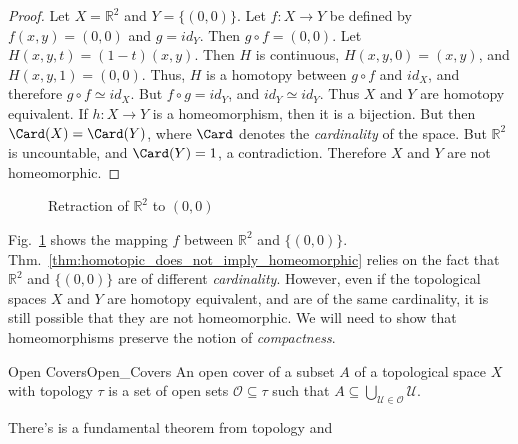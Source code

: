             \begin{proof}
                Let $X=\mathbb{R}^{2}$ and $Y=\{(0,0)\}$.
                Let $f:{X}\rightarrow{Y}$ be defined by
                $f(x,y)=(0,0)$ and $g=id_{Y}$. Then
                $g\circ{f}=(0,0)$. Let $H(x,y,t)=(1-t)(x,y)$.
                Then $H$ is continuous, $H(x,y,0)=(x,y)$,
                and $H(x,y,1)=(0,0)$. Thus, $H$ is a
                homotopy between ${g}\circ{f}$ and $id_{X}$, and
                therefore ${g}\circ{f}\simeq{id_{X}}$. But
                ${f}\circ{g}=id_{Y}$, and ${id_{Y}}\simeq{id_{Y}}$.
                Thus $X$ and $Y$ are homotopy equivalent.
                If $h:{X}\rightarrow{Y}$ is a homeomorphism, then it is a
                bijection. But then $\Card(X)=\Card(Y)$,
                where $\Card$ denotes the \textit{cardinality} of the space.
                But $\mathbb{R}^{2}$ is uncountable, and $\Card(Y)=1$,
                a contradiction. Therefore $X$ and $Y$ are not homeomorphic.
            \end{proof}
            \begin{figure}[H]
                \captionsetup{type=figure}
                \centering
                
                \caption{Retraction of $\mathbb{R}^{2}$ to $(0,0)$}
                \label{fig:homotopy_equivalence_of_plane_with_point}
            \end{figure}
            Fig.~\ref{fig:homotopy_equivalence_of_plane_with_point}
            shows the mapping $f$ between $\mathbb{R}^{2}$ and $\{(0,0)\}$.
            Thm.~\ref{thm:homotopic_does_not_imply_homeomorphic} relies on the
            fact that $\mathbb{R}^{2}$ and $\{(0,0)\}$ are of different
            \textit{cardinality}. However, even if the topological spaces $X$
            and $Y$ are homotopy equivalent, and are of the same cardinality,
            it is still possible that they are not homeomorphic. We will need
            to show that homeomorphisms preserve the notion of
            \textit{compactness}.
            \begin{ldefinition}{Open Covers}{Open_Covers}
                An open cover of a subset $A$ of a topological space $X$ with
                topology $\tau$ is a set of open sets
                $\mathcal{O}\subseteq\tau$ such that
                $A\subseteq\bigcup_{\mathcal{U}\in\mathcal{O}}\mathcal{U}$.
            \end{ldefinition}
            There's is a fundamental theorem from topology and
